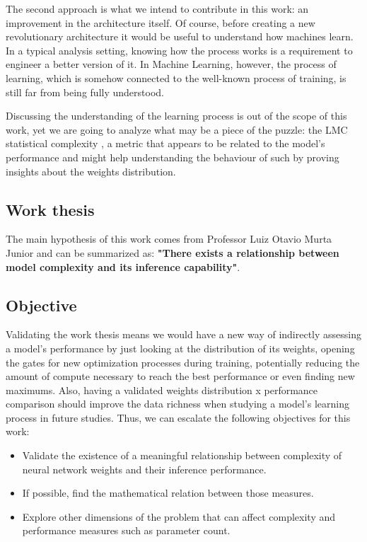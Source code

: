 The second approach is what we intend to contribute in this work: an improvement in the architecture itself. Of course, before creating a new revolutionary architecture it would be useful to understand how machines learn. In a typical analysis setting, knowing how the process works is a requirement to engineer a better version of it. In Machine Learning, however, the process of learning, which is somehow connected to the well-known process of training, is still far from being fully understood.

Discussing the understanding of the learning process is out of the scope of this work, yet we are going to analyze what may be a piece of the puzzle: the LMC statistical complexity \cite{LopezRuiz1995}, a metric that appears to be related to the model's performance and might help understanding the behaviour of such by proving insights about the weights distribution.

\subsection{Work thesis}

    The main hypothesis of this work comes from Professor Luiz Otavio Murta Junior \cite{MurtaJunior2025} and can be summarized as: \textbf{"There exists a relationship between model complexity and its inference capability"}.

\subsection{Objective}

    Validating the work thesis means we would have a new way of indirectly assessing a model's performance by just looking at the distribution of its weights, opening the gates for new optimization processes during training, potentially reducing the amount of compute necessary to reach the best performance or even finding new maximums. Also, having a validated weights distribution x performance comparison should improve the data richness when studying a model's learning process in future studies. Thus, we can escalate the following objectives for this work:
    \begin{itemize}
        \item Validate the existence of a meaningful relationship between complexity of neural network weights and their inference performance.
        \item If possible, find the mathematical relation between those measures.
        \item Explore other dimensions of the problem that can affect complexity and performance measures such as parameter count.
    \end{itemize}
